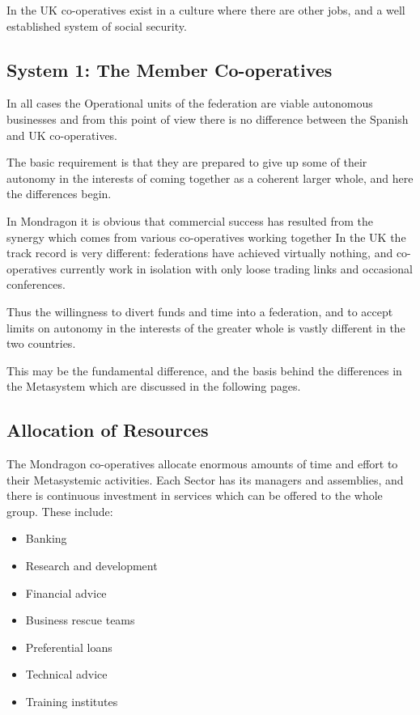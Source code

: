 In the UK co-operatives exist in a culture where there are other jobs, and a well established system of social security.

\subsection*{System 1: The Member Co-operatives}
In all cases the Operational units of the federation are viable autonomous businesses and from this point of view there is no difference between the Spanish and UK co-operatives.

The basic requirement is that they are prepared to give up some of their autonomy in the interests of coming together as a coherent larger whole, and here the differences begin.

In Mondragon it is obvious that commercial success has resulted from the synergy which comes from various co-operatives working together In the UK the track record is very different: federations have achieved virtually nothing, and co-operatives currently work in isolation with only loose trading links and occasional conferences.

Thus the willingness to divert funds and time into a federation, and to accept limits on autonomy in the interests of the greater whole is vastly different in the two countries.

This may be the fundamental difference, and the basis behind the differences in the Metasystem which are discussed in the following pages.

\subsection*{Allocation of Resources}
The Mondragon co-operatives allocate enormous amounts of time and effort to their Metasystemic activities. Each Sector has its managers and assemblies, and there is continuous investment in services which can be offered to the whole group. These include:

\begin{itemize}
  \item Banking

  \item Research and development

  \item Financial advice

  \item Business rescue teams

  \item Preferential loans

  \item Technical advice

  \item Training institutes

\end{itemize}

